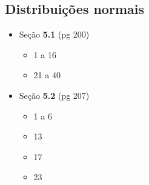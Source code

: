 \documentclass[a4paper]{article}
\begin{document}
\subsection{Distribuições normais}

\begin{itemize}
\item Seção {\bf 5.1} (pg 200)
  \begin{itemize}
  \item 1 a 16
  \item 21 a 40
  \end{itemize}
\item Seção {\bf 5.2} (pg 207)
  \begin{itemize}
  \item 1 a 6
  \item 13
  \item 17
  \item 23
  \end{itemize}
\end{itemize}
\end{document}
